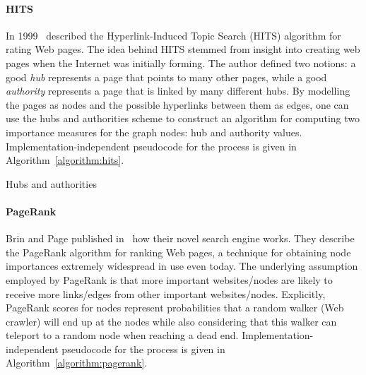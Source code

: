 \paragraph{HITS} In 1999~\cite{kleinberg_authoritative_1999} described the Hyperlink-Induced Topic Search (HITS) algorithm for rating Web pages. The idea behind HITS stemmed from insight into creating web pages when the Internet was initially forming. The author defined two notions: a good \emph{hub} represents a page that points to many other pages, while a good \emph{authority} represents a page that is linked by many different hubs. By modelling the pages as nodes and the possible hyperlinks between them as edges, one can use the hubs and authorities scheme to construct an algorithm for computing two importance measures for the graph nodes: hub and authority values. Implementation-independent pseudocode for the process is given in Algorithm~\ref{algorithm:hits}.

\begin{algorithm}%
\caption{Hubs and authorities}
\label{algorithm:hits}
\begin{algorithmic}
\ENDWHILE
{}
\end{algorithmic}
\end{algorithm}

\paragraph{PageRank} Brin and Page published in~\cite{brin_anatomy_1998} how their novel search engine works. They describe the PageRank algorithm for ranking Web pages, a technique for obtaining node importances extremely widespread in use even today. The underlying assumption employed by PageRank is that more important websites/nodes are likely to receive more links/edges from other important websites/nodes. Explicitly, PageRank scores for nodes represent probabilities that a random walker (Web crawler) will end up at the nodes while also considering that this walker can teleport to a random node when reaching a dead end. Implementation-independent pseudocode for the process is given in Algorithm~\ref{algorithm:pagerank}.

